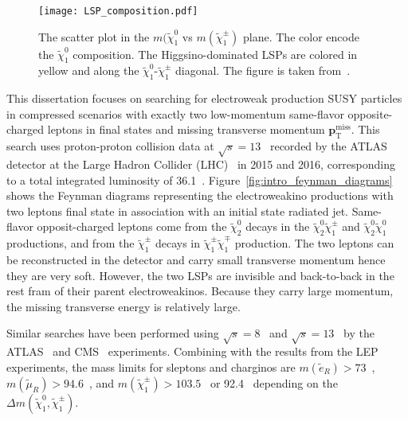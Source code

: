 \begin{figure}[htbp]
\begin{center}
\texttt{[image: LSP\_composition.pdf]}
\caption{The scatter plot in the $m(\widetilde{\chi}^{0}_{1}$ vs $m(\widetilde{\chi}^{\pm}_{1})$ plane.
The color encode the $\widetilde{\chi}^{0}_{1}$ composition.
The Higgsino-dominated LSPs are colored in yellow and along the $\widetilde{\chi}^{0}_{1}$-$\widetilde{\chi}^{\pm}_{1}$ diagonal.
The figure is taken from~\cite{Aaboud:2016wna}.}
\label{fig:intro_LSP_composition}
\end{center}
\end{figure}

This dissertation focuses on searching for electroweak production SUSY particles in compressed scenarios with exactly two low-momentum same-flavor opposite-charged leptons in final states and missing transverse momentum $\textbf{p}_{\text{T}}^{\text{miss}}$.
This search uses proton-proton collision data at $\sqrt{s} = 13$~{\TeV} recorded by the ATLAS detector at the Large Hadron Collider (LHC)~\cite{Evans:2008zzb} in 2015 and 2016, corresponding to a total integrated luminosity of 36.1~\ifb.
Figure~\ref{fig:intro_feynman_diagrams} shows the Feynman diagrams representing the electroweakino productions with two leptons final state in association with an initial state radiated jet.
Same-flavor opposit-charged leptons come from the $\widetilde{\chi}^{0}_{2}$ decays in the $\widetilde{\chi}^{0}_{2} \widetilde{\chi}^{\pm}_{1}$ and $\widetilde{\chi}^{0}_{2} \widetilde{\chi}^{0}_{1}$ productions, and from the $\widetilde{\chi}^{\pm}_{1}$ decays in $\widetilde{\chi}^{\pm}_{1} \widetilde{\chi}^{\mp}_{1}$ production.
The two leptons can be reconstructed in the detector and carry small transverse momentum  \pt hence they are very soft.
However, the two LSPs are invisible and back-to-back in the rest fram of their parent electroweakinos.
Because they carry large momentum, the missing transverse energy \met is relatively large.

Similar searches have been performed using $\sqrt{s} = 8$~{\TeV} and $\sqrt{s} = 13$~{\TeV} by the ATLAS~\cite{Aad:2014vma, Aad:2014nua, Aad:2015eda, Aaboud:2016wna} and CMS~\cite{Khachatryan:2014qwa, Khachatryan:2015pot, Sirunyan:2017lae} experiments.
Combining with the results from the LEP experiments, the mass limits for sleptons and charginos are $m(\widetilde{e}_{R}) > 73$~{\GeV}, $m(\widetilde{\mu}_{R}) > 94.6$~{\GeV}, and $m(\widetilde{\chi}^{\pm}_{1}) > 103.5$~{\GeV} or 92.4~{\GeV} depending on the $\Delta m(\widetilde{\chi}^{0}_{1}, \widetilde{\chi}^{\pm}_{1})$.

